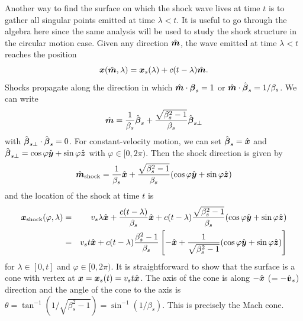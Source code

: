 \documentclass[12pt]{article}
\newcommand \beq {\begin{equation}}
\newcommand \eeq {\end{equation}}
\newcommand \beqn {\begin{eqnarray}}
\newcommand \eeqn {\end{eqnarray}}
\newcommand{\ve}[1]{\mbox{\boldmath $#1$}}
\begin{document}
Another way to find the surface on which the shock wave lives at time $t$ is to 
gather all singular points emitted at time $\lambda < t$. It is useful to go through 
the algebra here since the same analysis will be used to study the shock 
structure in the circular motion case. 
Given any direction $\hat{\ve{m}}$, the wave emitted at time $\lambda < t$ reaches the 
position 
\beq
  \ve{x}(\hat{\ve{m}},\lambda) = \ve{x}_s(\lambda) + c(t-\lambda) \hat{\ve{m}} .
\label{eq:xmlambda}
\eeq
Shocks propagate along the direction in which $\hat{\ve{m}}\cdot \ve{\beta}_s=1$ or 
$\hat{\ve{m}}\cdot \hat{\ve{\beta}}_s=1/\beta_s$. We can write 
\beq
  \hat{\ve{m}} =\frac{1}{\beta_s} \hat{\ve{\beta}}_s + 
\frac{\sqrt{\beta_s^2-1}}{\beta_s} \hat{\ve{\beta}}_{s\perp} 
\label{eq:mshock}
\eeq
with $\hat{\ve{\beta}}_{s\perp} \cdot \hat{\ve{\beta}}_s=0$. For constant-velocity motion, 
we can set $\hat{\ve{\beta}}_s=\hat{\ve{x}}$ and 
$\hat{\ve{\beta}}_{s\perp}=\cos \varphi \hat{\ve{y}} + \sin \varphi \hat{\ve{z}}$ with 
$\varphi \in [0,2\pi)$. Then the shock direction is given by 
\beq
 \hat{\ve{m}}_{\rm shock} = \frac{1}{\beta_s} \hat{\ve{x}} + 
\frac{\sqrt{\beta_s^2-1}}{\beta_s} (\cos \varphi \hat{\ve{y}} + \sin \varphi \hat{\ve{z}}) 
\eeq
and the location of the shock at time $t$ is 
\beqn
  \ve{x}_{\rm shock}(\varphi,\lambda) &=& v_s \lambda \hat{\ve{x}} + 
\frac{c(t-\lambda)}{\beta_s}\hat{\ve{x}} + c(t-\lambda) \frac{\sqrt{\beta_s^2-1}}{\beta_s} 
(\cos \varphi \hat{\ve{y}} + \sin \varphi \hat{\ve{z}}) \\ 
&=& v_s t \hat{\ve{x}} + c(t-\lambda)\frac{\beta_s^2-1}{\beta_s}\left[ -\hat{\ve{x}} 
+ \frac{1}{\sqrt{\beta_s^2-1}}(\cos \varphi \hat{\ve{y}} + \sin \varphi \hat{\ve{z}})\right] 
\eeqn
for $\lambda \in [0,t]$ and $\varphi \in [0,2\pi)$. It is straightforward to show that 
the surface is a cone with vertex at $\ve{x}=\ve{x}_s(t)=v_s t\hat{\ve{x}}$. The axis of 
the cone is along $-\hat{\ve{x}}$ ($=-\hat{\ve{v}}_s$) direction and the angle of the cone to the axis 
is $\theta = \tan^{-1}(1/\sqrt{\beta_s^2-1})=\sin^{-1}(1/\beta_s)$. This is precisely 
the Mach cone.
\end{document}
